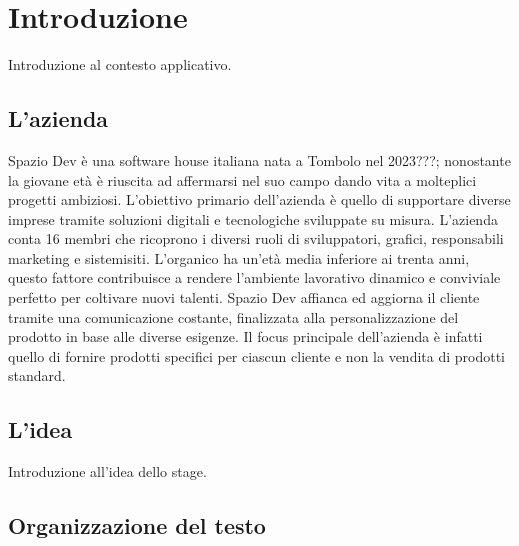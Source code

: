 \chapter{Introduzione}
\label{cap:introduzione}

Introduzione al contesto applicativo.\\

%
%
%
%

\section{L'azienda}

Spazio Dev è una software house italiana nata a Tombolo nel 2023???; nonostante la giovane età è riuscita ad affermarsi nel suo campo dando vita a molteplici progetti ambiziosi. L'obiettivo primario dell'azienda è quello di supportare diverse imprese tramite soluzioni digitali e tecnologiche sviluppate su misura.
L'azienda conta 16 membri che ricoprono i diversi ruoli di sviluppatori, grafici, responsabili marketing e sistemisiti. L'organico ha un'età media inferiore ai trenta anni, questo fattore contribuisce a rendere l'ambiente lavorativo dinamico e conviviale perfetto per coltivare nuovi talenti.
Spazio Dev affianca ed aggiorna il cliente tramite una comunicazione costante, finalizzata alla personalizzazione del prodotto in base alle diverse esigenze. Il focus principale dell'azienda è infatti quello di fornire prodotti specifici per ciascun cliente e non la vendita di prodotti standard.


\section{L'idea}

Introduzione all'idea dello stage.

\section{Organizzazione del testo}

